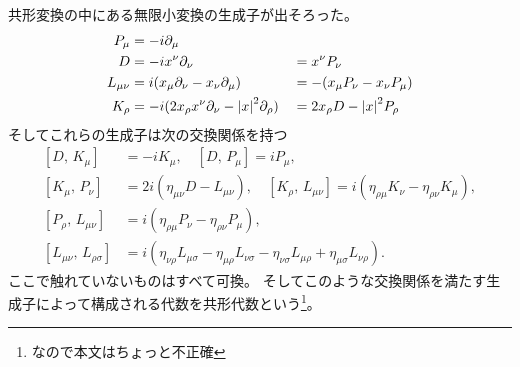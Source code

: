 \documentclass[../../master.tex]{subfiles}
\begin{document}
共形変換の中にある無限小変換の生成子が出そろった。
\begin{alignat}{4}
    P_\mu &= -i\partial_\mu& &\notag\\
    D &= -ix^\nu\partial_\nu &&= x^\nu P_\nu\\
    L_{\mu\nu} &= i(x_\mu\partial_\nu-x_\nu\partial_\mu)&&=-(x_\mu P_\nu-x_\nu P_\mu)\notag\\
    K_\rho &= -i(2x_\rho x^\nu\partial_\nu - \abs{x}^2\partial_\rho)
    &&=2x_\rho D - \abs{x}^2 P_\rho
\end{alignat}
そしてこれらの生成子は次の交換関係を持つ
\begin{equation}
    \begin{split}
        [D,\,K_\mu] &= -iK_\mu, \quad
        [D,\,P_\mu] = iP_\mu, \\
        [K_\mu,\,P_\nu] &= 2i(\eta_{\mu\nu}D-L_{\mu\nu}), \quad
        [K_\rho,\,L_{\mu\nu}] = i(\eta_{\rho\mu} K_\nu -\eta_{\rho\nu}K_{\mu}),\\
        [P_\rho,\,L_{\mu\nu}] &= i(\eta_{\rho\mu}P_\nu-\eta_{\rho\nu}P_\mu),\\
        [L_{\mu\nu},\,L_{\rho\sigma}] &= i(\eta_{\nu\rho}L_{\mu\sigma}-\eta_{\mu\rho}L_{\nu\sigma}-\eta_{\nu\sigma}L_{\mu\rho}+\eta_{\mu\sigma}L_{\nu\rho}).
    \end{split}
\end{equation}
ここで触れていないものはすべて可換。
そしてこのような交換関係を満たす生成子によって構成される代数を共形代数という\footnote{なので本文はちょっと不正確}。
\end{document}
